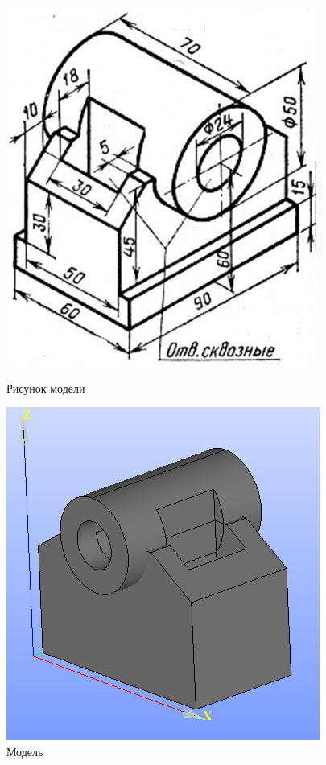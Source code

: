 \documentclass[a4paper,12pt]{article}
\theoremstyle{plain} %
\theoremstyle{definition} %
\theoremstyle{remark} %
\begin{document}
	\begin{figure}[h]
		\begin{center}
			\begin{minipage}[h]{0.4\linewidth}
				\includegraphics[width=1\linewidth]{17.3}
				\caption{Рисунок модели} %
			\end{minipage}
			\hfill
			\begin{minipage}[h]{0.4\linewidth}
				\includegraphics[width=1\linewidth]{17.32}
				\caption{Модель}
			\end{minipage}
		\end{center}
	\end{figure}
\end{document}
